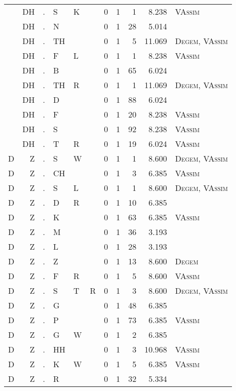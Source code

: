 \begin{longtable}{r@{ } r@{ } c@{ } l@{ } l@{ } l@{ } r r r r l }
 & DH & . & S & K &  & 0 & 1 & 1 & 8.238 & \textsc{VAssim} \\
 & DH & . & N &  &  & 0 & 1 & 28 & 5.014 &  \\
 & DH & . & TH &  &  & 0 & 1 & 5 & 11.069 & \textsc{Degem}, \textsc{VAssim} \\
 & DH & . & F & L &  & 0 & 1 & 1 & 8.238 & \textsc{VAssim} \\
 & DH & . & B &  &  & 0 & 1 & 65 & 6.024 &  \\
 & DH & . & TH & R &  & 0 & 1 & 1 & 11.069 & \textsc{Degem}, \textsc{VAssim} \\
 & DH & . & D &  &  & 0 & 1 & 88 & 6.024 &  \\
 & DH & . & F &  &  & 0 & 1 & 20 & 8.238 & \textsc{VAssim} \\
 & DH & . & S &  &  & 0 & 1 & 92 & 8.238 & \textsc{VAssim} \\
 & DH & . & T & R &  & 0 & 1 & 19 & 6.024 & \textsc{VAssim} \\
D & Z & . & S & W &  & 0 & 1 & 1 & 8.600 & \textsc{Degem}, \textsc{VAssim} \\
D & Z & . & CH &  &  & 0 & 1 & 3 & 6.385 & \textsc{VAssim} \\
D & Z & . & S & L &  & 0 & 1 & 1 & 8.600 & \textsc{Degem}, \textsc{VAssim} \\
D & Z & . & D & R &  & 0 & 1 & 10 & 6.385 &  \\
D & Z & . & K &  &  & 0 & 1 & 63 & 6.385 & \textsc{VAssim} \\
D & Z & . & M &  &  & 0 & 1 & 36 & 3.193 &  \\
D & Z & . & L &  &  & 0 & 1 & 28 & 3.193 &  \\
D & Z & . & Z &  &  & 0 & 1 & 13 & 8.600 & \textsc{Degem} \\
D & Z & . & F & R &  & 0 & 1 & 5 & 8.600 & \textsc{VAssim} \\
D & Z & . & S & T & R & 0 & 1 & 3 & 8.600 & \textsc{Degem}, \textsc{VAssim} \\
D & Z & . & G &  &  & 0 & 1 & 48 & 6.385 &  \\
D & Z & . & P &  &  & 0 & 1 & 73 & 6.385 & \textsc{VAssim} \\
D & Z & . & G & W &  & 0 & 1 & 2 & 6.385 &  \\
D & Z & . & HH &  &  & 0 & 1 & 3 & 10.968 & \textsc{VAssim} \\
D & Z & . & K & W &  & 0 & 1 & 5 & 6.385 & \textsc{VAssim} \\
D & Z & . & R &  &  & 0 & 1 & 32 & 5.334 &  \\

\end{longtable}
